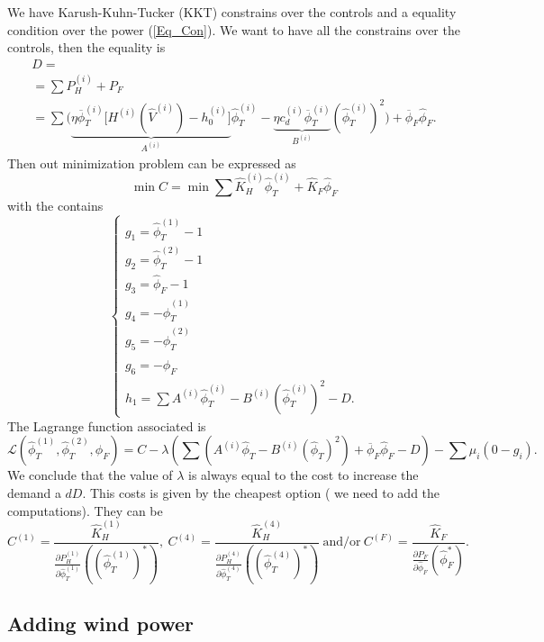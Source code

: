 \documentclass[12pt]{article}
\theoremstyle{definition}
\theoremstyle{remark}
\begin{document}
We have Karush-Kuhn-Tucker (KKT) constrains over the controls and a equality condition over the power (\ref{Eq_Con}). We want to have all the constrains over the controls, then the equality is
\begin{multline*}
D=\\
=\sum P_H^{(i)}+P_F\\
=\sum\Bigg(\underbrace{\eta\overline{\phi}_T^{(i)}\Big[H^{(i)}(\hat{V}^{(i)})-h_0^{(i)}\Big]}_{A^{(i)}}\hat{\phi}_T^{(i)}-\underbrace{\eta c_d^{(i)}\overline{\phi}_T^{(i)}}_{B^{(i)}}(\hat{\phi}_T^{(i)})^2\Bigg)+\overline{\phi}_F\hat{\phi}_F.
\end{multline*}
Then out minimization problem can be expressed as
\begin{equation*}
\min C=\min\sum\hat{K}_H^{(i)}\hat{\phi}_T^{(i)}+\hat{K}_F\hat{\phi}_F
\end{equation*}
with the contains
\begin{equation*}
\begin{cases}
g_1=\hat{\phi}_T^{(1)}-1\\
g_2=\hat{\phi}_T^{(2)}-1\\
g_3=\hat{\phi}_F-1\\
g_4=-\hat{\phi}_T^{(1)}\\
g_5=-\hat{\phi}_T^{(2)}\\
g_6=-\hat{\phi}_F\\
h_1=\sum A^{(i)}\hat{\phi}_T^{(i)}-B^{(i)}(\hat{\phi}_T^{(i)})^2-D.
\end{cases}
\end{equation*}
The Lagrange function associated is
\begin{equation*}
\mathcal{L}(\hat{\phi}_T^{(1)},\hat{\phi}_T^{(2)},\hat{\phi}_F)=C-\lambda(\sum(A^{(i)}\hat{\phi}_T-B^{(i)}(\hat{\phi}_T)^2)+\overline{\phi}_F\hat{\phi}_F-D)-\sum\mu_i(0-g_i).
\end{equation*}
We conclude that the value of $\lambda$ is always equal to the cost to increase the demand a $dD$. This costs is given by the cheapest option ({\color[rgb]{1,0,0} we need to add the computations}). They can be
\begin{equation*}
C^{(1)}=\frac{\hat{K}_H^{(1)}}{\frac{\partial P_H^{(1)}}{\partial\hat{\phi}_T^{(1)}}((\hat{\phi}_T^{(1)})^*)},\ C^{(4)}=\frac{\hat{K}_H^{(4)}}{\frac{\partial P_H^{(4)}}{\partial\hat{\phi}_T^{(4)}}((\hat{\phi}_T^{(4)})^*)}\ \text{and/or}\ C^{(F)}=\frac{\hat{K}_F}{\frac{\partial P_F}{\partial\hat{\phi}_F}(\hat{\phi}_F^*)}.
\end{equation*}

\subsection{Adding wind power}
\end{document}
